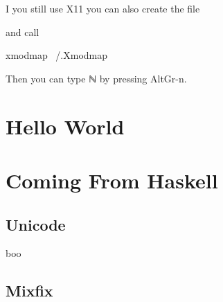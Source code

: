 \documentclass[12pt]{article}
\begin{document}
I you still use X11 you can also create the file

and call
\begin{listing}
xmodmap ~/.Xmodmap
\end{listing}
Then you can type ℕ by pressing AltGr-n.

\section{Hello World}


\section{Coming From Haskell}
\subsection{Unicode}
boo

\subsection{Mixfix}
\section{}

\printbibliography{}
\end{document}
